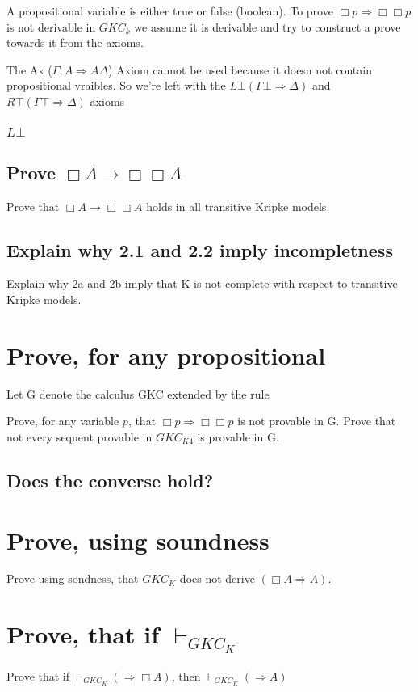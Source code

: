 \documentclass{article}
\begin{document}
A propositional variable is either true or false (boolean). To prove 
$\Box p \Rightarrow \Box \Box p$ is not derivable in $GKC_k$ we assume
it is derivable and try to construct a prove towards it from the axioms.

The Ax ($\Gamma, A \Rightarrow A \Delta$) Axiom cannot be used because it
doesn not contain propositional vraibles. So we're left with the 
$L\bot(\Gamma \bot \Rightarrow \Delta)$ and $R\top(\Gamma \top
\Rightarrow \Delta)$ axioms
\subsubsection{$L\bot$}
\begin{prooftree}
\end{prooftree}


\subsection{Prove $\Box A \to \Box \Box A$ }
Prove that $\Box A \to \Box \Box A$ holds in all transitive Kripke models.


\subsection{Explain why 2.1 and 2.2 imply incompletness}
Explain why 2a and 2b imply that K is not complete with respect to
transitive Kripke models.
\section{Prove, for any propositional}
Let G denote the calculus GKC extended by the rule
\begin{prooftree}
\end{prooftree}
Prove, for any variable $p$, that $\Box p \Rightarrow \Box \Box p$ is
not provable in G. Prove that not every sequent provable in $GKC_{K4}$
is provable in G. 
\subsection{Does the converse hold?}
\section{Prove, using soundness}
Prove using sondness, that $GKC_K$ does not derive $(\Box A \Rightarrow A)$.

\section{Prove, that if $\vdash_{GKC_K}$}
Prove that if $\vdash_{GKC_K}(\Rightarrow \Box A)$, then 
$\vdash_{GKC_K}(\Rightarrow A)$
\end{document}

